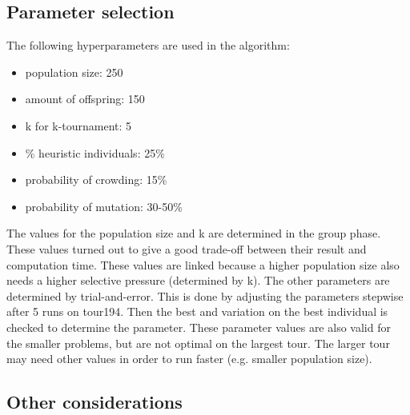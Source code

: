 \documentclass[a4paper,10pt]{article}
\newcommand{\ReplaceMe}[1]{{\color{blue}#1}}
\begin{document}

\subsection{Parameter selection}\label{ssec:parameters}

The following hyperparameters are used in the algorithm:

\begin{itemize}
  \item population size: 250
  \item amount of offspring: 150
  \item k for k-tournament: 5
  \item \% heuristic individuals: 25\%
  \item probability of crowding: 15\%
  \item probability of mutation: 30-50\%
\end{itemize}
The values for the population size and k are determined in the group phase. These values turned out to give a good trade-off between their result and computation time. These values are linked because a higher population size also needs a higher selective pressure (determined by k).
The other parameters are determined by trial-and-error. This is done by adjusting the parameters stepwise after 5 runs on tour194. Then the best and variation on the best individual is checked to determine the parameter. These parameter values are also valid for the smaller problems, but are not optimal on the largest tour. The larger tour may need other values in order to run faster (e.g. smaller population size).

\subsection{Other considerations}\label{ssec:considerations}
\end{document}
